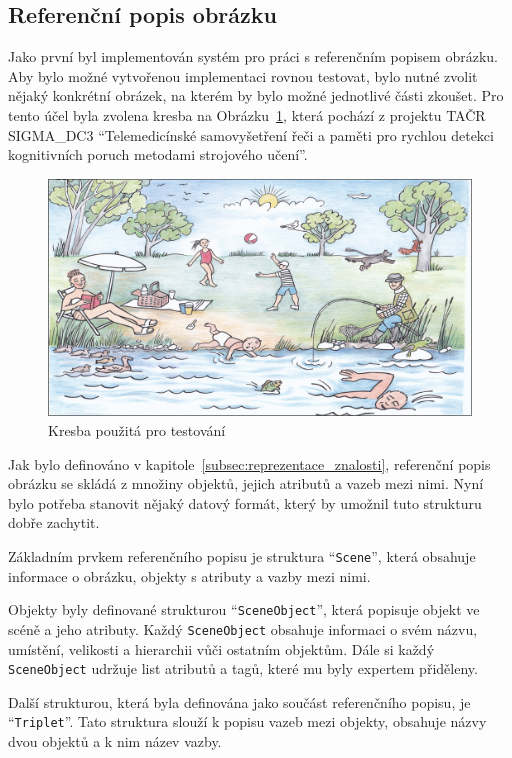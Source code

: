 \subsection{Referenční popis obrázku}\label{subsec:referencni_popis}
Jako první byl implementován systém pro práci s referenčním popisem obrázku.
Aby bylo možné vytvořenou implementaci rovnou testovat, bylo nutné zvolit nějaký konkrétní obrázek,
na kterém by bylo možné jednotlivé části zkoušet.
Pro tento účel byla zvolena kresba na Obrázku~\ref{fig:summer}, která pochází
z projektu TAČR SIGMA\_DC3 \enquote{Telemedicínské samovyšetření řeči a paměti pro rychlou detekci kognitivních poruch metodami strojového učení}.

\begin{figure}[ht!]
	\centering
	\includegraphics[width=\textwidth]{./src/imgs/summer.png}
	\caption{Kresba použitá pro testování}\label{fig:summer}
\end{figure}

Jak bylo definováno v kapitole~\ref{subsec:reprezentace_znalosti}, referenční popis obrázku se skládá z
množiny objektů, jejich atributů a vazeb mezi nimi.
Nyní bylo potřeba stanovit nějaký datový formát, který by umožnil tuto strukturu dobře zachytit.

\newpage
Základním prvkem referenčního popisu je struktura \enquote{\texttt{Scene}}, která obsahuje informace o obrázku, objekty s atributy a vazby mezi nimi.

Objekty byly definované strukturou \enquote{\texttt{SceneObject}}, která popisuje objekt ve scéně a jeho atributy.
Každý \texttt{SceneObject} obsahuje informaci o svém názvu, umístění, velikosti a hierarchii vůči ostatním objektům.
Dále si každý \texttt{SceneObject} udržuje list atributů a tagů, které mu byly expertem přiděleny.

Další strukturou, která byla definována jako součást referenčního popisu, je \enquote{\texttt{Triplet}}.
Tato struktura slouží k popisu vazeb mezi objekty, obsahuje názvy dvou objektů a k nim název vazby.

